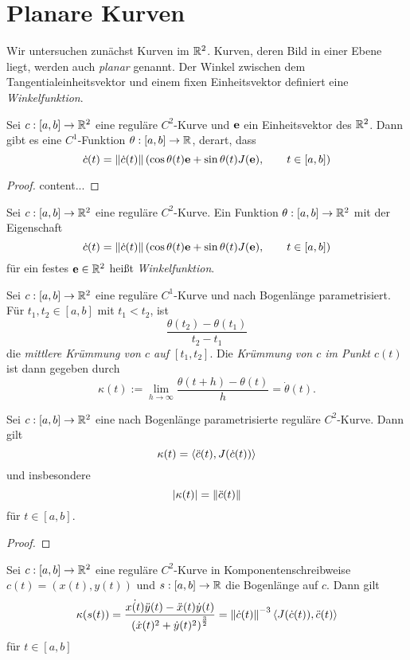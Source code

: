 \documentclass[
pdftex,
oneside,
headsepline,
11pt, 
]{scrreprt}
\begin{document}
\section{Planare Kurven}
Wir untersuchen zunächst Kurven im $\mathbb{R}^2$. Kurven, deren Bild in einer Ebene liegt, werden auch \textit{planar} genannt. Der Winkel zwischen dem Tangentialeinheitsvektor und einem fixen Einheitsvektor definiert eine \textit{Winkelfunktion}.
\begin{lem}
	Sei $c:[a,b]\to \mathbb{R}^2$ eine reguläre $C^2$-Kurve und $\textnormal{\textbf{e}}$ ein Einheitsvektor des $\mathbb{R}^2$. Dann gibt es eine $C^1$-Funktion $\theta:[a,b]\to \mathbb{R}$, derart, dass \[  \dot{c}(t)=\left\lVert\dot{c}(t)\right\rVert\left(  \cos \theta(t)\textnormal{\textbf{e}}+\sin\theta(t)J(\textnormal{\textbf{e}}), \qquad t\in [a,b]  \right) \]	
\end{lem}
\begin{proof}
	content...
\end{proof}
\begin{de}[Winkelfunktion]
	Sei $c:[a,b]\to \mathbb{R}^2$ eine reguläre $C^2$-Kurve. Ein Funktion $\theta:[a,b]\to\mathbb{R}^2$ mit der Eigenschaft \[  \dot{c}(t)=\left\lVert\dot{c}(t)\right\rVert\left(  \cos \theta(t)\textnormal{\textbf{e}}+\sin\theta(t)J(\textnormal{\textbf{e}}), \qquad t\in [a,b]  \right) \]
	für ein festes $\textnormal{\textbf{e}}\in\mathbb{R}^2$ heißt \textit{Winkelfunktion}.
\end{de}
\begin{de}
	Sei $c:[a,b]\to \mathbb{R}^2$ eine reguläre $C^1$-Kurve und nach Bogenlänge parametrisiert. Für $t_1,t_2\in[a,b]$ mit $t_1<t_2$, ist \[ \frac{\theta(t_2)-\theta(t_1)}{t_2-t_1} \] die \textit{mittlere Krümmung von $c$ auf $[t_1,t_2]$}. Die \textit{Krümmung von $c$ im Punkt $c(t)$} ist dann gegeben durch \[ \kappa(t):=\lim_{h\to \infty} \frac{\theta(t+h)-\theta(t)}{h}=\dot{\theta}(t). \]  
\end{de}
\begin{lem}
	Sei $c:[a,b]\to \mathbb{R}^2$ eine nach Bogenlänge parametrisierte reguläre $C^2$-Kurve. Dann gilt
	\[ \kappa(t)=\left\langle \ddot{c}(t),J(\dot{c}(t)) \right\rangle \] und insbesondere 
	\[|\kappa(t)|=\left\lVert\ddot{c}(t)\right\rVert\] für $t\in[a,b]$.
\end{lem}
\begin{proof}

\end{proof}
\begin{lem}
Sei $c:[a,b]\to \mathbb{R}^2$ eine reguläre $C^2$-Kurve in Komponentenschreibweise $c(t)=(x(t),y(t))$ und $s:[a,b]\to\mathbb{R}$ die Bogenlänge auf $c$. Dann gilt
\[\kappa(s(t))=\frac{\dot{x(t)}\ddot{y}(t)-\ddot{x}(t)\dot{y}(t)}{\left( \dot{x}(t)^2+\dot{y}(t)^2  \right)^{\frac{3}{2}}}=\left\lVert\dot{c}(t)\right\rVert^{-3}\left\langle J(\dot{c}(t)),\ddot{c}(t) \right\rangle\] für $t\in[a,b]$
\end{lem}
\end{document}
